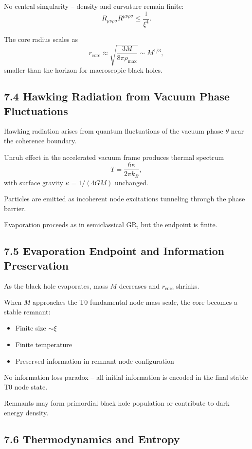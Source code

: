 	No central singularity – density and curvature remain finite:
	\[
	R_{\mu\nu\rho\sigma} R^{\mu\nu\rho\sigma} \leq \frac{1}{\xi^4}.
	\]
	
	The core radius scales as
	\[
	r_{\text{core}} \approx \sqrt{\frac{3M}{8\pi \rho_{\text{max}}}} \sim M^{1/3},
	\]
	smaller than the horizon for macroscopic black holes.
	
	\subsection{7.4 Hawking Radiation from Vacuum Phase Fluctuations}
	
	Hawking radiation arises from quantum fluctuations of the vacuum phase $\theta$ near the coherence boundary.
	
	Unruh effect in the accelerated vacuum frame produces thermal spectrum
	\[
	T = \frac{\hbar \kappa}{2\pi k_B},
	\]
	with surface gravity $\kappa = 1/(4GM)$ unchanged.
	
	Particles are emitted as incoherent node excitations tunneling through the phase barrier.
	
	Evaporation proceeds as in semiclassical GR, but the endpoint is finite.
	
	\subsection{7.5 Evaporation Endpoint and Information Preservation}
	
	As the black hole evaporates, mass $M$ decreases and $r_{\text{core}}$ shrinks.
	
	When $M$ approaches the T0 fundamental node mass scale, the core becomes a stable remnant:
	\begin{itemize}
		\item Finite size $\sim \xi$
		\item Finite temperature
		\item Preserved information in remnant node configuration
	\end{itemize}
	
	No information loss paradox – all initial information is encoded in the final stable T0 node state.
	
	Remnants may form primordial black hole population or contribute to dark energy density.
	
	\subsection{7.6 Thermodynamics and Entropy}
	
